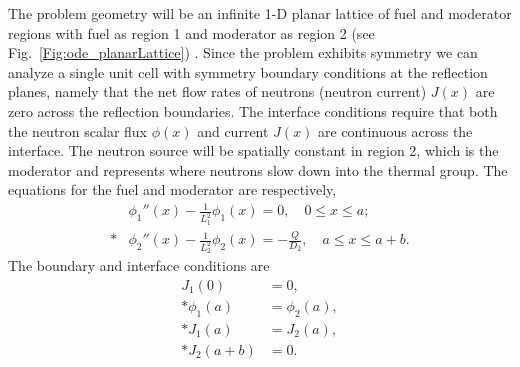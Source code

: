 The problem geometry will be an infinite 1-D planar lattice of fuel and moderator regions with fuel as region 1 and moderator as region 2 (see Fig.~\ref{Fig:ode_planarLattice}) . Since the problem exhibits symmetry we can analyze a single unit cell with symmetry boundary conditions at the reflection planes, namely that the net flow rates of neutrons (neutron current) $J(x)$ are zero across the reflection boundaries. The interface conditions require that both the neutron scalar flux $\phi(x)$ and current $J(x)$ are continuous across the interface. The neutron source will be spatially constant in region 2, which is the moderator and represents where neutrons slow down into the thermal group. The equations for the fuel and moderator are respectively,
\begin{subequations}
\begin{align}
  &\phi_1''(x) - \frac{1}{L_1^2} \phi_1(x) = 0, \quad 0 \le x \le a; \\*
  &\phi_2''(x) - \frac{1}{L_2^2} \phi_2(x) = -\frac{Q}{D_2}, \quad a \le x \le a + b.
\end{align}
\end{subequations}
The boundary and interface conditions are
\begin{subequations}
\begin{align}
  J_1(0) &= 0, \\*
  \phi_1(a) &= \phi_2(a), \\*
  J_1(a) &= J_2(a), \\*
  J_2(a+b) &= 0.
\end{align}
\end{subequations}

